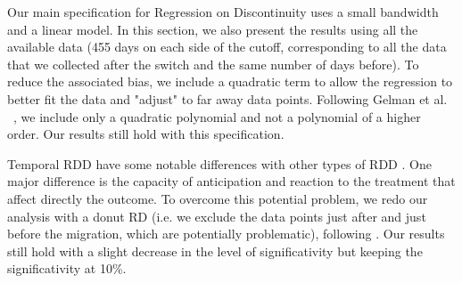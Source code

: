 \documentclass[conference]{IEEEtran}
\begin{document}
Our main specification for Regression on Discontinuity uses a small bandwidth and a linear model. In this section, we also present the results using all the available data (455 days on each side of the cutoff, corresponding to all the data that we collected after the switch and the same number of days before). To reduce the associated bias, we include a quadratic term to allow the regression to better fit the data and "adjust" to far away data points. Following Gelman et al. ~\cite{gelman2018high}, we include only a quadratic polynomial and not a polynomial of a higher order. Our results still hold with this specification. 

Temporal RDD have some notable differences with other types of RDD \cite{hausman2018regression}. One major difference is the capacity of anticipation and reaction to the treatment that affect directly the outcome. To overcome this potential problem, we redo our analysis with a donut RD (i.e. we exclude the data points just after and just before the migration, which are potentially problematic), following \cite{hausman2018regression}. Our results still hold with a slight decrease in the level of significativity but keeping the significativity at 10\%. 



\end{document}
